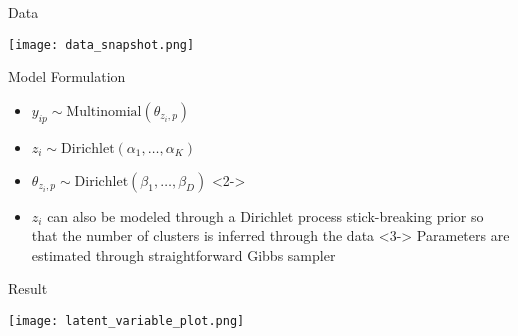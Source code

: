 \documentclass{beamer}
\begin{document}
\begin{frame}{Data}
	\begin{itemize}
		\texttt{[image: data\_snapshot.png]}
	\end{itemize}
\end{frame}


\begin{frame}{Model Formulation}
	\begin{itemize}
		\item $y_{ip} \sim \text{Multinomial} (\theta_{z_i, p})$
		\item $z_i \sim \text{Dirichlet}(\alpha_1, \ldots, \alpha_K)$
		\item $\theta_{z_i, p} \sim \text{Dirichlet}(\beta_1, \ldots, \beta_D)$
		<2->\item $z_i$ can also be modeled through a Dirichlet process stick-breaking prior so that the number of clusters is inferred through the data
		<3-> Parameters are estimated through straightforward Gibbs sampler
	\end{itemize}
\end{frame}

\begin{frame}{Result}
	\begin{itemize}
		\texttt{[image: latent\_variable\_plot.png]}
	\end{itemize}
\end{frame}
\end{document}
